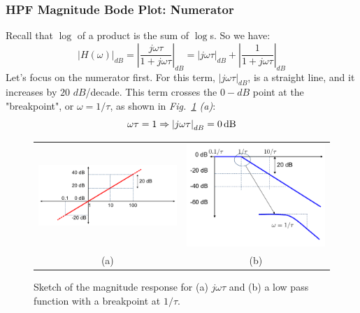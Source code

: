 \subsubsection{HPF Magnitude Bode Plot: Numerator}
Recall that $\log$ of a product is the sum of $\log$s.  So we have:
    \begin{equation}
        {\left| {H(\omega )} \right|_{dB}} = {\left| {\frac{{j\omega \tau }}{{1 + j\omega \tau }}} \right|_{dB}} = {\left| {j\omega \tau } \right|_{dB}} + {\left| {\frac{1}{{1 + j\omega \tau }}} \right|_{dB}}
    \end{equation}
Let's focus on the numerator first.  For this term, $\left|j\omega \tau  \right|_{dB} $, is a straight line, and it increases by $20$ $dB$/decade.  This term crosses the $0-dB$ point at the "breakpoint", or $\omega = 1/\tau$, as shown in \emph{Fig.~\ref{fig:hpfnumden} (a)}:
    \begin{equation}
        \omega \tau  = 1 \Rightarrow {\left| {j\omega \tau } \right|_{dB}} = 0\,{\rm{dB}}
    \end{equation}
\begin{figure}[tb]
\centering
\begin{tabular}{cc}
\includegraphics[width=.55\columnwidth]{mod1_3_9_bode1} &
\includegraphics[width=.35\columnwidth]{mod1_3_10_bode2}\\
(a) & (b)\\
\end{tabular}
\caption{Sketch of the magnitude response for (a) $j\omega \tau$ and (b) a low pass function with a breakpoint at $1/\tau$.}
\label{fig:hpfnumden}
\end{figure}
